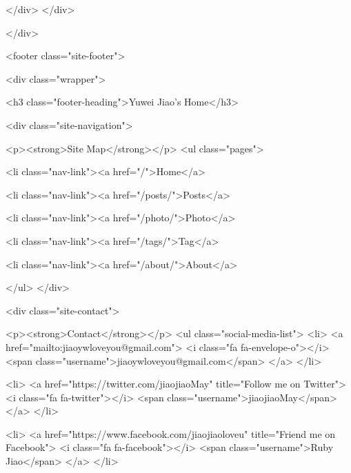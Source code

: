 </div>
</div>

    </div>

    <footer class="site-footer">

  <div class="wrapper">

    <h3 class="footer-heading">Yuwei Jiao's Home</h3>

    <div class="site-navigation">
      
      <p><strong>Site Map</strong></p>
      <ul class="pages">
        
        
          <li class="nav-link"><a href="/">Home</a>
        
        
        
          <li class="nav-link"><a href="/posts/">Posts</a>
        
        
        
          <li class="nav-link"><a href="/photo/">Photo</a>
        
        
        
          <li class="nav-link"><a href="/tags/">Tag</a>
        
        
        
          <li class="nav-link"><a href="/about/">About</a>
        
        
        
        
        
        
        
        
      </ul>
    </div>

    <div class="site-contact">

      <p><strong>Contact</strong></p>
      <ul class="social-media-list">
        <li>
          <a href="mailto:jiaoywloveyou@gmail.com">
            <i class="fa fa-envelope-o"></i>
            <span class="username">jiaoywloveyou@gmail.com</span>
          </a>
        </li>

        
          
          <li>
            <a href="https://twitter.com/jiaojiaoMay" title="Follow me on Twitter">
              <i class="fa fa-twitter"></i>
              <span class="username">jiaojiaoMay</span>
            </a>
          </li>
          
        
          
          <li>
            <a href="https://www.facebook.com/jiaojiaoloveu" title="Friend me on Facebook">
              <i class="fa fa-facebook"></i>
              <span class="username">Ruby Jiao</span>
            </a>
          </li>
          

